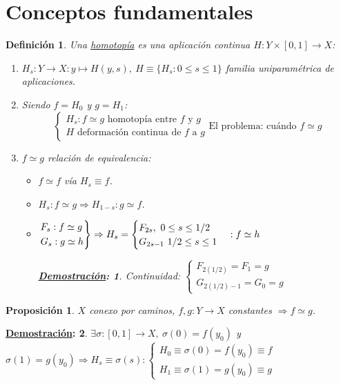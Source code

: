 \documentclass[10pt,a4paper,openright]{book}
\theoremstyle{break}
\newtheorem*{defi}{Definición}
\newtheorem*{prop}{Proposición}
\newtheorem*{demo}{\underline{Demostración}:}
\begin{document}
\section{Conceptos fundamentales}%
\label{sec:conceptos_fundamentales}
\begin{defi}
Una \underline{homotopía} es una aplicación continua $H : Y \times \left[ 0, 1 \right] \rightarrow X$:
\begin{enumerate}
    \item $H_s : Y \rightarrow X: y \mapsto H\left( y, s \right),\ H \equiv \{H_s: 0 \le s \le 1\}$ familia uniparamétrica de aplicaciones.
    \item Siendo $f = H_0$ y $g = H_1$:
    \[
    \begin{cases}
        H_s : f \simeq g \text{ homotopía entre } f \text{ y } g\\
        H \text{ deformación continua de } f \text{ a } g
    \end{cases} \boxed{\text{El problema: cuándo } f \simeq g} 
    \]

    \item $f \simeq g$ relación de equivalencia:
    \begin{itemize}
        \item $f \simeq f$ vía $H_s \equiv f$.
        \item $H_s : f \simeq g \Rightarrow H_{1 - s} : g \simeq f$.
        \item $\begin{rcases}
            F_s : f \simeq g\\
            G_s: g \simeq h
        \end{rcases} \Rightarrow H_s = \begin{cases}
            F_{2s},\ 0 \le s \le 1/2\\
            G_{2s - 1}\ 1/2 \le s \le 1
        \end{cases}: f \simeq h$
        \begin{demo}
            Continuidad: $\begin{cases}
            F_{2(1/2)} = F_1 = g\\
            G_{2(1/2) - 1} = G_0 = g
            \end{cases}$
        \end{demo}
    \end{itemize}
\end{enumerate}
\end{defi}

\begin{prop}
$X$ conexo por caminos, $f, g: Y \rightarrow X$ constantes $\Rightarrow f \simeq g$.
\end{prop}
\begin{demo}
$\exists \sigma: \left[ 0, 1 \right] \rightarrow X,\ \sigma\left( 0 \right) = f\left( y_0 \right)$ y $\sigma\left( 1 \right) = g\left( y_0 \right) \Rightarrow H_s \equiv \sigma\left( s \right) : \begin{cases}
    H_0 \equiv \sigma\left( 0 \right) = f\left( y_0 \right) \equiv f\\
    H_1 \equiv \sigma\left( 1 \right) = g\left( y_0 \right) \equiv g
\end{cases}$
\end{demo}
\end{document}
